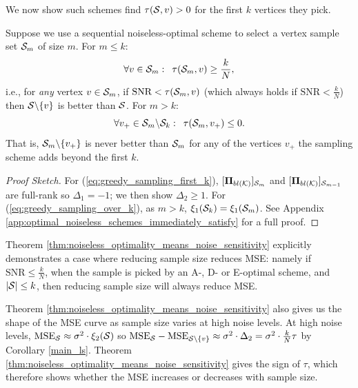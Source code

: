 We now show such schemes find $\tau(\mathcal{S},v) > 0$ for the first $k$ vertices they pick.
   
\begin{theorem}
\label{thm:noiseless_optimality_means_noise_sensitivity}
    Suppose we use a sequential noiseless-optimal scheme to select a vertex sample set $\mathcal{S}_{m}$ of size $m$. For $m \leq k$:
    \begin{equation}
    \label{eq:greedy_sampling_first_k}
        \forall v \in \mathcal{S}_{m}: \enskip \tau(\mathcal{S}_{m},v) \geq \frac{k}{N},
    \end{equation}
    i.e., for \emph{any} vertex $v \in \mathcal{S}_{m}$, if $\text{SNR} < \tau(\mathcal{S}_{m},v)$ (which always holds if $\text{SNR} < \frac{k}{N}$) then $\mathcal{S} \backslash \{v\}$ is better than $\mathcal{S}$. For $m > k$:
    \begin{equation}
        \label{eq:greedy_sampling_over_k}
        \forall v_{+} \in \mathcal{S}_{m} \backslash \mathcal{S}_{k}: \enskip \tau(\mathcal{S}_{m},v_{+}) \leq 0.
    \end{equation}
    That is, $\mathcal{S}_{m}\backslash \{v_{+}\}$ is never better than $\mathcal{S}_{m}$ for any of the vertices $v_{+}$ the sampling scheme adds beyond the first $k$.
\end{theorem}



\begin{proof}[Proof Sketch]
For (\ref{eq:greedy_sampling_first_k}), $\projblgen[\set{S}_{m}]$ and $\projblgen[\set{S}_{m-1}]$ are full-rank so $\Delta_{1} = -1$; we then show $\Delta_{2} \geq 1$. For (\ref{eq:greedy_sampling_over_k}), as $m>k$, $\xi_{1}(\mathcal{S}_{k}) = \xi_{1}(\mathcal{S}_{m})$. See Appendix \ref{app:optimal_noiseless_schemes_immediately_satisfy} for a full proof.
\end{proof}

 Theorem \ref{thm:noiseless_optimality_means_noise_sensitivity} explicitly demonstrates a case where reducing sample size reduces MSE: namely if $\text{SNR} \leq \frac{k}{N}$, when the sample is picked by an A-, D- or E-optimal scheme, and $|\mathcal{S}| \leq k$, then reducing sample size will always reduce MSE.

Theorem \ref{thm:noiseless_optimality_means_noise_sensitivity} also gives us the shape of the MSE curve as sample size varies at high noise levels. {\color{black} At high noise levels, $\text{MSE}_{\mathcal{S}} \approx \sigma^{2} \cdot \xi_{2}(\mathcal{S})$ so  $\text{MSE}_{\mathcal{S}} - \text{MSE}_{\mathcal{S}\backslash \{v\}} \approx \sigma^{2} \cdot \Delta_{2} = \sigma^{2} \cdot \frac{k}{N} \tau$ by Corollary \ref{main_ls}. Theorem \ref{thm:noiseless_optimality_means_noise_sensitivity} gives the sign of $\tau$, which therefore shows whether the MSE increases or decreases with sample size.}%

